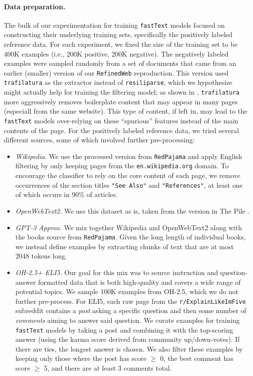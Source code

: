 \documentclass{article}
\newcommand{\oh}{\textsc{OH-2.5}\xspace}
\newcommand{\rpj}{\texttt{RedPajama}\xspace}
\newcommand{\rw}{\texttt{RefinedWeb}\xspace}
\newcommand{\trafilatura}{\texttt{trafilatura}\xspace}
\newcommand{\resiliparse}{\texttt{resiliparse}\xspace}
\newcommand{\fasttext}{\texttt{fastText}\xspace}
\begin{document}
\paragraph{Data preparation.}
The bulk of our experimentation for training \fasttext models focused on constructing their underlying training sets, specifically the positively labeled reference data. For each experiment, we fixed the size of the training set to be 400K examples (i.e., 200K positive, 200K negative). The negatively labeled examples were sampled randomly from a set of documents that came from an earlier (smaller) version of our \rw reproduction. This version used \trafilatura as the extractor instead of \resiliparse, which we hypothesize might actually help for training the filtering model; as shown in , \trafilatura more aggressively removes boilerplate content that may appear in many pages (especiall from the same website). This type of content, if left in, may lead to the \fasttext models over-relying on these ``spurious'' features instead of the main contents of the page. For the positively labeled reference data, we tried several different sources, some of which involved further pre-processing: \begin{itemize}
    \item \textit{Wikipedia.} We use the processed version from \rpj \citep{rpj} and apply English filtering by only keeping pages from the \texttt{en.wikipedia.org} domain. To encourage the classifier to rely on the core content of each page, we remove occurrences of the section titles \texttt{"See Also"} and \texttt{"References"}, at least one of which occurs in 90\% of articles.
    \item \textit{OpenWebText2.} We use this dataset as is, taken from the version in The Pile \citep{pile}.
    \item \textit{GPT-3 Approx.} We mix together Wikipedia and OpenWebText2 along with the books source from \rpj \citep{rpj}. Given the long length of individual books, we instead define examples by extracting chunks of text that are at most 2048 tokens long.
    \item \textit{\oh + ELI5.}  Our goal for this mix was to source instruction and question-answer formatted data that is both high-quality and covers a wide range of potential topics. We sample 100K examples from \oh, which we do not further pre-process. For ELI5, each raw page from the \texttt{r/ExplainLikeImFive} subreddit contains a \textit{post} asking a specific question and then some number of \textit{comments} aiming to answer said question. We curate examples for training \fasttext models by taking a post and combining it with the top-scoring answer (using the karma score derived from community up/down-votes). If there are ties, the longest answer is chosen. We also filter these examples by keeping only those where the post has score $\geq$ 0, the best comment has score $\geq$ 5, and there are at least 3 comments total.
\end{itemize}
\end{document}
